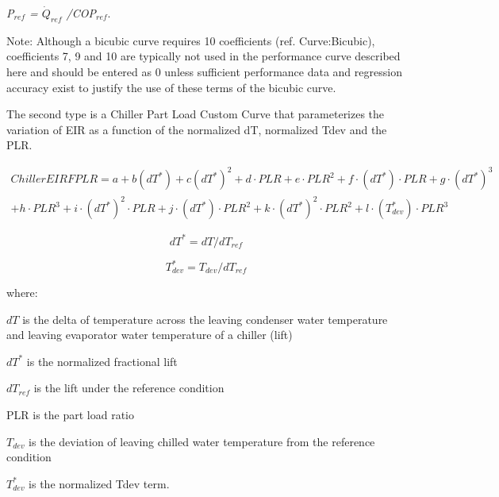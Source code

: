 \emph{P\(_{ref}\) = \({\dot{Q}_{ref}}\) /COP\(_{ref}\)}.

Note: Although a bicubic curve requires 10 coefficients (ref. Curve:Bicubic), coefficients 7, 9 and 10 are typically not used in the performance curve described here and should be entered as 0 unless sufficient performance data and regression accuracy exist to justify the use of these terms of the bicubic curve.

The second type is a Chiller Part Load Custom Curve that parameterizes the variation of EIR as a function of the normalized dT, normalized Tdev and the PLR.

\begin{equation}
\begin{split}
ChillerEIRFPLR = a + b(dT^*) + c(dT^*)^2 + d \cdot PLR + e \cdot PLR^2 + f \cdot (dT^*) \cdot PLR + g \cdot (dT^*)^3 \\
+ h \cdot PLR^3 + i \cdot (dT^*)^2 \cdot PLR + j \cdot (dT^*) \cdot PLR^2 + k \cdot (dT^*)^2 \cdot PLR^2 + l \cdot (T_{dev}^*) \cdot PLR^3
\end{split}
\end{equation}

\begin{equation}
dT^* = dT / dT_{ref}
\end{equation}

\begin{equation}
T_{dev}^* = T_{dev} / dT_{ref}
\end{equation}

where:

\(dT\) is the delta of temperature across the leaving condenser water temperature and leaving evaporator water temperature of a chiller (lift)

\(dT^*\) is the normalized fractional lift

\(dT_{ref}\) is the lift under the reference condition

PLR is the part load ratio

\(T_{dev}\) is the deviation of leaving chilled water temperature from the reference condition

\(T_{dev}^*\) is the normalized Tdev term.

